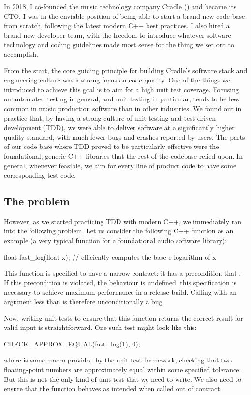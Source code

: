 In 2018, I co-founded the music technology company Cradle (\hyperref[https://cradle.app]{}) and became its CTO. I was in the enviable position of being able to start a brand new code base from scratch, following the latest modern C++ best practices. I also hired a brand new developer team, with the freedom to introduce whatever software technology and coding guidelines made most sense for the thing we set out to accomplish.

From the start, the core guiding principle for building Cradle's software stack and engineering culture was a strong focus on code quality. One of the things we introduced to achieve this goal is to aim for a high unit test coverage. Focusing on automated testing in general, and unit testing in particular, tends to be less common in  music production software than in other industries. We found out in practice that, by having a strong culture of unit testing and test-driven development (TDD), we were able to deliver software at  a significantly higher quality standard, with much fewer bugs and crashes reported by users. The parts of our code base where TDD proved to be particularly effective were the foundational, generic C++ libraries that the rest of the codebase relied upon. In general, whenever feasible, we aim for every line of product code to have some corresponding test code.

\subsection{The problem}

However, as we started practicing TDD with modern C++, we immediately ran into the following problem. Let us consider the following C++ function as an example (a very typical function for a foundational audio software library):
\begin{codeblock}
float fast_log(float x);  // efficiently computes the base e logarithm of x
\end{codeblock}

This function is specified to have a narrow contract: it has a precondition that . If this precondition is violated, the behaviour is undefined; this specification is necessary to achieve maximum performance in a release build. Calling  with an argument less than  is therefore unconditionally a bug.

Now, writing unit tests to ensure that this function returns the correct result for valid input is straightforward. One such test might look like this:
\begin{codeblock}
CHECK_APPROX_EQUAL(fast_log(1), 0);
\end{codeblock}
where  is some macro provided by the unit test framework, checking that two floating-point numbers are approximately equal within some specified tolerance. But this is not the only kind of unit test that we need to write. We also need to ensure that the function behaves as intended when called out of contract.

